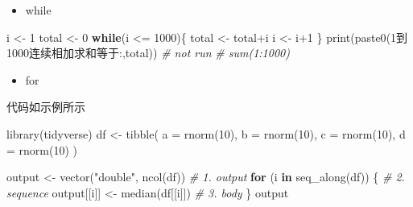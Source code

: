 \documentclass[
]{book}
\newenvironment{Shaded}{\begin{snugshade}}{\end{snugshade}}
\newcommand{\AttributeTok}[1]{\textcolor[rgb]{0.77,0.63,0.00}{#1}}
\newcommand{\CommentTok}[1]{\textcolor[rgb]{0.56,0.35,0.01}{\textit{#1}}}
\newcommand{\ControlFlowTok}[1]{\textcolor[rgb]{0.13,0.29,0.53}{\textbf{#1}}}
\newcommand{\DecValTok}[1]{\textcolor[rgb]{0.00,0.00,0.81}{#1}}
\newcommand{\FunctionTok}[1]{\textcolor[rgb]{0.00,0.00,0.00}{#1}}
\newcommand{\NormalTok}[1]{#1}
\newcommand{\OtherTok}[1]{\textcolor[rgb]{0.56,0.35,0.01}{#1}}
\newcommand{\SpecialCharTok}[1]{\textcolor[rgb]{0.00,0.00,0.00}{#1}}
\newcommand{\StringTok}[1]{\textcolor[rgb]{0.31,0.60,0.02}{#1}}
\providecommand{\tightlist}{%
  \setlength{\itemsep}{0pt}\setlength{\parskip}{0pt}}
\begin{document}
\begin{itemize}
\tightlist
\item
  while
\end{itemize}

\begin{Shaded}
\begin{Highlighting}[]
\NormalTok{i }\OtherTok{\textless{}{-}} \DecValTok{1}
\NormalTok{total }\OtherTok{\textless{}{-}} \DecValTok{0}
\ControlFlowTok{while}\NormalTok{(i }\SpecialCharTok{\textless{}=} \DecValTok{1000}\NormalTok{)\{}
\NormalTok{  total }\OtherTok{\textless{}{-}}\NormalTok{ total}\SpecialCharTok{+}\NormalTok{i}
\NormalTok{  i }\OtherTok{\textless{}{-}}\NormalTok{ i}\SpecialCharTok{+}\DecValTok{1}
\NormalTok{\}}
\FunctionTok{print}\NormalTok{(}\FunctionTok{paste0}\NormalTok{(}\StringTok{\textquotesingle{}1到1000连续相加求和等于:\textquotesingle{}}\NormalTok{,total))}
\CommentTok{\# not run}
\CommentTok{\# sum(1:1000)}
\end{Highlighting}
\end{Shaded}

\begin{itemize}
\tightlist
\item
  for
\end{itemize}

代码如示例所示

\begin{Shaded}
\begin{Highlighting}[]
\FunctionTok{library}\NormalTok{(tidyverse)}
\NormalTok{df }\OtherTok{\textless{}{-}} \FunctionTok{tibble}\NormalTok{(}
  \AttributeTok{a =} \FunctionTok{rnorm}\NormalTok{(}\DecValTok{10}\NormalTok{),}
  \AttributeTok{b =} \FunctionTok{rnorm}\NormalTok{(}\DecValTok{10}\NormalTok{),}
  \AttributeTok{c =} \FunctionTok{rnorm}\NormalTok{(}\DecValTok{10}\NormalTok{),}
  \AttributeTok{d =} \FunctionTok{rnorm}\NormalTok{(}\DecValTok{10}\NormalTok{)}
\NormalTok{)}

\NormalTok{output }\OtherTok{\textless{}{-}} \FunctionTok{vector}\NormalTok{(}\StringTok{"double"}\NormalTok{, }\FunctionTok{ncol}\NormalTok{(df))  }\CommentTok{\# 1. output}
\ControlFlowTok{for}\NormalTok{ (i }\ControlFlowTok{in} \FunctionTok{seq\_along}\NormalTok{(df)) \{            }\CommentTok{\# 2. sequence}
\NormalTok{  output[[i]] }\OtherTok{\textless{}{-}} \FunctionTok{median}\NormalTok{(df[[i]])      }\CommentTok{\# 3. body}
\NormalTok{\}}
\NormalTok{output}
\end{Highlighting}
\end{Shaded}
\end{document}
